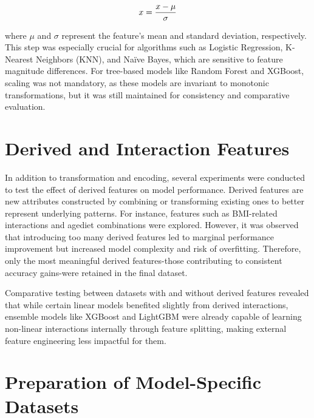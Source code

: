 \begin{equation}
    \centering
    x=\frac{x-\mu}{\sigma}
    \label{eq:eq_standard_Scaling}
\end{equation}

where $\mu$ and $\sigma$ represent the feature’s mean and standard deviation, respectively.
This step was especially crucial for algorithms such as Logistic Regression, K-Nearest Neighbors (KNN), and Naïve Bayes, which are sensitive to feature magnitude differences.
For tree-based models like Random Forest and XGBoost, scaling was not mandatory, as these models are invariant to monotonic transformations, but it was still maintained for consistency and comparative evaluation.



\section{Derived and Interaction Features}\label{sec:derived-and-interaction-features}

In addition to transformation and encoding, several experiments were conducted to test the effect of derived features on model performance.
Derived features are new attributes constructed by combining or transforming existing ones to better represent underlying patterns.
For instance, features such as BMI-related interactions and agediet combinations were explored.
However, it was observed that introducing too many derived features led to marginal performance improvement but increased model complexity and risk of overfitting.
Therefore, only the most meaningful derived features-those contributing to consistent accuracy gains-were retained in the final dataset.

Comparative testing between datasets with and without derived features revealed that while certain linear models benefited slightly from derived interactions, ensemble models like XGBoost and LightGBM were already capable of learning non-linear interactions internally through feature splitting, making external feature engineering less impactful for them.



\section{Preparation of Model-Specific Datasets}\label{sec:preparation-of-model-specific-datasets}

